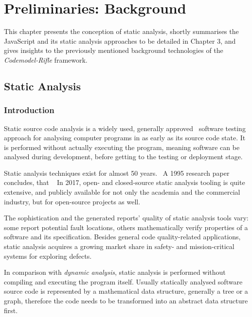 \chapter{Preliminaries: Background}

This chapter presents the conception of static analysis, shortly summarises the JavaScript and its static analysis approaches to be detailed in Chapter 3, and gives insights to the previously mentioned background technologies of the \emph{Codemodel-Rifle} framework.


\section{Static Analysis}


\subsection{Introduction}

Static source code analysis is a widely used, generally approved~\cite{373902} software testing approach for analysing computer programs in as early as its source code state. It is performed without actually executing the program, meaning software can be analysed during development, before getting to the testing or deployment stage.

Static analysis techniques exist for almost 50 years.~\cite{emanuelsson2008comparative} A 1995 research paper concludes, that ~\cite{373902} In 2017, open- and closed-source static analysis tooling is quite extensive, and publicly available for not only the academia and the commercial industry, but for open-source projects as well.~\cite{wikipedia-static-analysis}

The sophistication and the generated reports' quality of static analysis tools vary: some report potential fault locations, others mathematically verify properties of a software and its specification. Besides general code quality-related applications, static analysis acquires a growing market share in safety- and mission-critical systems for exploring defects.~\cite{livshits2006improving}

In comparison with \emph{dynamic analysis}, static analysis is performed without compiling and executing the program itself. Usually statically analysed software source code is represented by a mathematical data structure, generally a tree or a graph, therefore the code needs to be transformed into an abstract data structure first.


